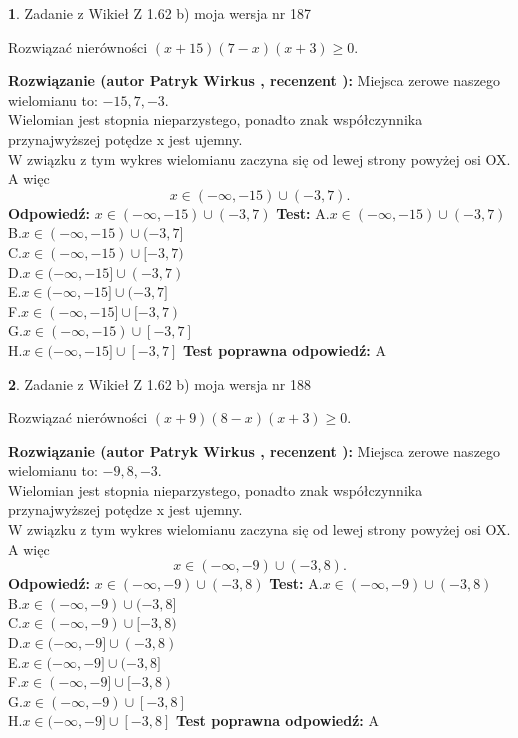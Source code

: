 \documentclass[12pt, a4paper]{article}
\theoremstyle{definition} %
\newtheorem{zad}{}
\newcommand{\zadStart}[1]{\begin{zad}#1\newline}
\newcommand{\zadStop}{\end{zad}}
\newcommand{\rozwStart}[2]{\noindent \textbf{Rozwiązanie (autor #1 , recenzent #2): }\newline}
\newcommand{\rozwStop}{\newline}
\newcommand{\odpStart}{\noindent \textbf{Odpowiedź:}\newline}
\newcommand{\odpStop}{\newline}
\newcommand{\testStart}{\noindent \textbf{Test:}\newline}
\newcommand{\testStop}{\newline}
\newcommand{\kluczStart}{\noindent \textbf{Test poprawna odpowiedź:}\newline}
\newcommand{\kluczStop}{\newline}
\begin{document}
\zadStart{Zadanie z Wikieł Z 1.62 b) moja wersja nr 187}

Rozwiązać nierówności $(x+15)(7-x)(x+3)\ge0$.
\zadStop
\rozwStart{Patryk Wirkus}{}
Miejsca zerowe naszego wielomianu to: $-15, 7, -3$.\\
Wielomian jest stopnia nieparzystego, ponadto znak współczynnika przy\linebreak najwyższej potędze x jest ujemny.\\ W związku z tym wykres wielomianu zaczyna się od lewej strony powyżej osi OX. A więc $$x \in (-\infty,-15) \cup (-3,7).$$
\rozwStop
\odpStart
$x \in (-\infty,-15) \cup (-3,7)$
\odpStop
\testStart
A.$x \in (-\infty,-15) \cup (-3,7)$\\
B.$x \in (-\infty,-15) \cup (-3,7]$\\
C.$x \in (-\infty,-15) \cup [-3,7)$\\
D.$x \in (-\infty,-15] \cup (-3,7)$\\
E.$x \in (-\infty,-15] \cup (-3,7]$\\
F.$x \in (-\infty,-15] \cup [-3,7)$\\
G.$x \in (-\infty,-15) \cup [-3,7]$\\
H.$x \in (-\infty,-15] \cup [-3,7]$
\testStop
\kluczStart
A
\kluczStop



\zadStart{Zadanie z Wikieł Z 1.62 b) moja wersja nr 188}

Rozwiązać nierówności $(x+9)(8-x)(x+3)\ge0$.
\zadStop
\rozwStart{Patryk Wirkus}{}
Miejsca zerowe naszego wielomianu to: $-9, 8, -3$.\\
Wielomian jest stopnia nieparzystego, ponadto znak współczynnika przy\linebreak najwyższej potędze x jest ujemny.\\ W związku z tym wykres wielomianu zaczyna się od lewej strony powyżej osi OX. A więc $$x \in (-\infty,-9) \cup (-3,8).$$
\rozwStop
\odpStart
$x \in (-\infty,-9) \cup (-3,8)$
\odpStop
\testStart
A.$x \in (-\infty,-9) \cup (-3,8)$\\
B.$x \in (-\infty,-9) \cup (-3,8]$\\
C.$x \in (-\infty,-9) \cup [-3,8)$\\
D.$x \in (-\infty,-9] \cup (-3,8)$\\
E.$x \in (-\infty,-9] \cup (-3,8]$\\
F.$x \in (-\infty,-9] \cup [-3,8)$\\
G.$x \in (-\infty,-9) \cup [-3,8]$\\
H.$x \in (-\infty,-9] \cup [-3,8]$
\testStop
\kluczStart
A
\kluczStop
\end{document}
